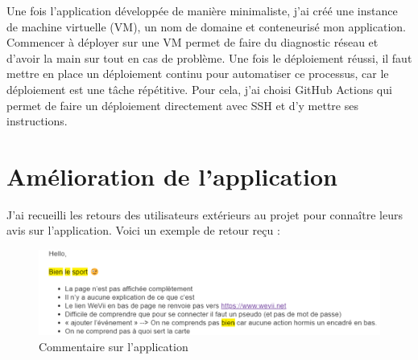 Une fois l’application développée de manière minimaliste, j'ai créé une instance de machine virtuelle (VM), un nom de domaine et conteneurisé mon application.
Commencer à déployer sur une VM permet de faire du diagnostic réseau et d’avoir la main sur tout en cas de problème.
Une fois le déploiement réussi, il faut mettre en place un déploiement continu pour automatiser ce processus, car le déploiement est une tâche répétitive.
Pour cela, j’ai choisi GitHub Actions qui permet de faire un déploiement directement avec SSH et d'y mettre ses instructions.

\section{Amélioration de l’application}

J'ai recueilli les retours des utilisateurs extérieurs au projet pour connaître leurs avis sur l’application.
Voici un exemple de retour reçu :
\begin{figure}[H]
    \centering
    \includegraphics[width=\textwidth]{image/bienLeSportFYT}
    \caption{Commentaire sur l'application}
    \label{fig:commentaire_application}
\end{figure}

